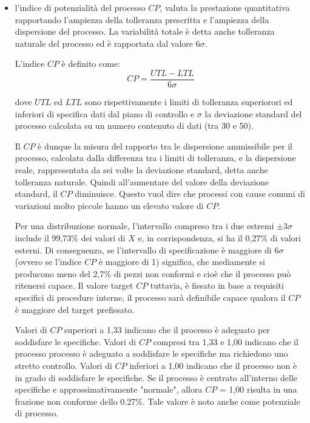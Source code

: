 \begin{itemize}
  \item l'indice di potenzialità del processo $CP$, valuta la prestazione quantitativa rapportando l'ampiezza della tolleranza prescritta e l'ampiezza della dispersione del processo.
La variabilità totale è detta anche tolleranza naturale del processo ed è rapportata dal valore $\mathit{6\sigma}$. 

L'indice $CP$ è definito come: 
\begin{equation}CP =\frac{UTL-LTL}{6\sigma} 
\label {eqn: CP}
\end{equation}

dove $UTL$ ed $LTL$ sono rispettivamente i limiti di tolleranza superiorori ed inferiori di specifica dati dal piano di controllo e $\mathit{\sigma}$ la deviazione standard del processo calcolata su un numero contenuto di dati (tra 30 e 50).


Il $CP$ è dunque la misura del rapporto tra le dispersione ammissibile per il processo, calcolata dalla differenza tra i limiti di tolleranza, e la dispersione reale, rappresentata da sei volte la deviazione standard, detta anche tolleranza naturale. 
Quindi all'aumentare del valore della deviazione standard, il $CP$ diminuisce.
Questo vuol dire che processi con cause comuni di variazioni molto piccole hanno un elevato valore di $CP$.
\cite{WikCP}



Per una distribuzione normale, l'intervallo compreso tra i due estremi $\mathit{\pm3\sigma}$ include il 99,73\% dei valori di $X$ e, in corrispondenza, si ha il 0,27\% di valori esterni.
Di conseguenza, se l'intervallo di specificazione è maggiore di $\mathit{6\sigma}$ (ovvero se l'indice $CP$ è maggiore di 1) significa, che mediamente si producono meno del 2,7\% di pezzi non conformi e cioè che il processo può ritenersi capace.
Il valore target $CP$ tuttavia, è fissato in base a requisiti specifici di procedure interne, il processo sarà definibile capace qualora il $CP$ è maggiore del target prefissato.
\cite{montgomery2009statistical}

Valori di $CP$ superiori a 1,33 indicano che il processo è adeguato per soddisfare le specifiche. Valori di $CP$  compresi tra 1,33 e 1,00 indicano che il processo processo è adeguato a soddisfare le specifiche ma richiedono uno stretto controllo.
 Valori di $CP$ inferiori a 1,00 indicano che il processo non è in grado di soddisfare le specifiche. Se il processo è centrato all'interno delle specifiche e approssimativamente "normale", allora $CP$ = 1,00 risulta in una frazione non conforme dello 0.27\%. 
 Tale valore è noto anche come potenziale di processo. 
 \cite{Wooluru}
 



\end{itemize}
